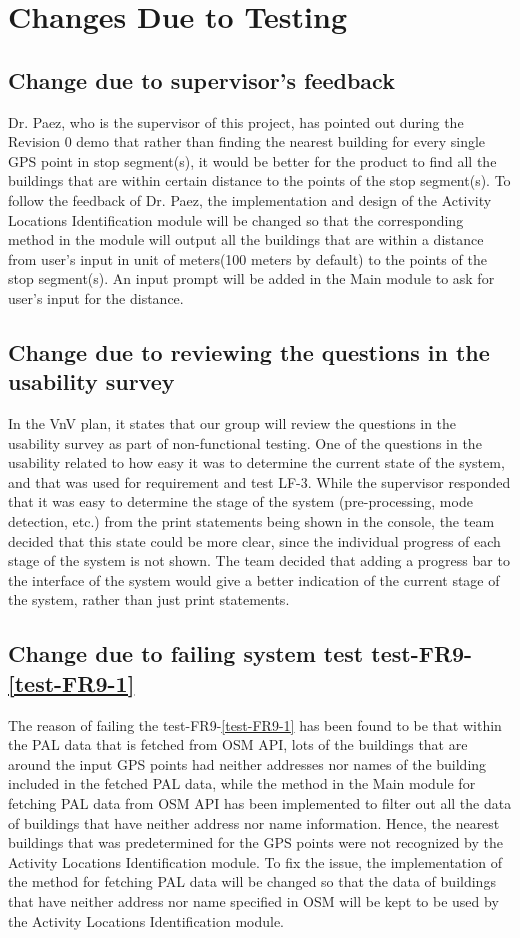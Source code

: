 \documentclass[12pt, titlepage]{article}
\begin{document}
\section{Changes Due to Testing}

\subsection{Change due to supervisor's feedback}
Dr. Paez, who is the supervisor of this project, has pointed out during the Revision 0 demo that rather than finding the nearest building for every single GPS point in stop segment(s), it would be better for the product to find all the buildings that are within certain distance to the points of the stop segment(s). To follow the feedback of Dr. Paez, the implementation and design of the Activity Locations Identification module will be changed so that the corresponding method in the module will output all the buildings that are within a distance from user's input in unit of meters(100 meters by default) to the points of the stop segment(s). An input prompt will be added in the Main module to ask for user's input for the distance.

\subsection{Change due to reviewing the questions in the usability survey}
In the VnV plan, it states that our group will review the questions in the usability survey as part of non-functional testing. One of the questions in the usability related to how easy it was to determine the current state of the system, and that was used for requirement and test LF-3. While the supervisor responded that it was easy to determine the stage of the system (pre-processing, mode detection, etc.) from the print statements being shown in the console, the team decided that this state could be more clear, since the individual progress of each stage of the system is not shown. The team decided that adding a progress bar to the interface of the system would give a better indication of the current stage of the system, rather than just print statements.

\subsection{Change due to failing system test test-FR9-\ref{test-FR9-1}}
The reason of failing the test-FR9-\ref{test-FR9-1} has been found to be that within the PAL data that is fetched from OSM API, lots of the buildings that are around the input GPS points had neither addresses nor names of the building included in the fetched PAL data, while the method in the Main module for fetching PAL data from OSM API has been implemented to filter out all the data of buildings that have neither address nor name information. Hence, the nearest buildings that was predetermined for the GPS points were not recognized by the Activity Locations Identification module. To fix the issue, the implementation of the method for fetching PAL data will be changed so that the data of buildings that have neither address nor name specified in OSM will be kept to be used by the Activity Locations Identification module.
\end{document}

